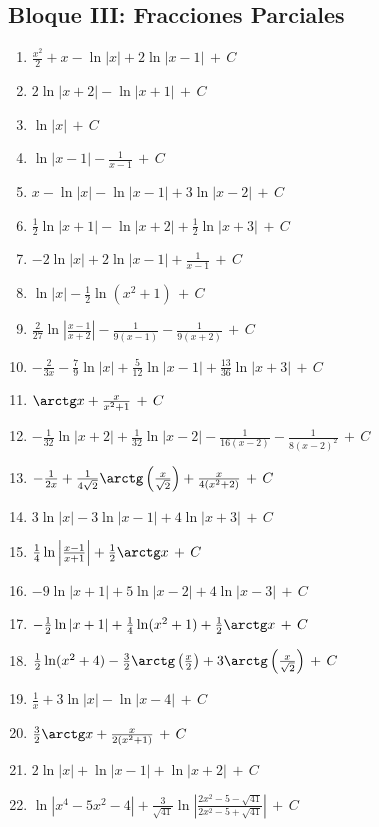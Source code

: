 \documentclass[12pt, letterpaper]{article}
\newcommand{\CC}{\,+\,C}
\begin{document}
\subsection*{Bloque III: Fracciones Parciales}
\begin{enumerate}[leftmargin=*, label=\textbf{\arabic*.}, resume]
  \item $\frac{x^2}{2} + x - \ln|x| + 2\ln|x-1| \CC$
  \item $2\ln|x+2| - \ln|x+1| \CC$
  \item $\ln|x| \CC$
  \item $\ln|x-1| - \frac{1}{x-1} \CC$
  \item $x - \ln|x| - \ln|x-1| + 3\ln|x-2| \CC$
  \item $\frac{1}{2}\ln|x+1| - \ln|x+2| + \frac{1}{2}\ln|x+3| \CC$
  \item $-2\ln|x| + 2\ln|x-1| + \frac{1}{x-1} \CC$
  \item $\ln|x| - \frac{1}{2}\ln(x^2+1) \CC$
  \item $\frac{2}{27}\ln\left|\frac{x-1}{x+2}\right| - \frac{1}{9(x-1)} - \frac{1}{9(x+2)} \CC$
  \item $-\frac{2}{3x} - \frac{7}{9}\ln|x| + \frac{5}{12}\ln|x-1| + \frac{13}{36}\ln|x+3| \CC$
  \item $\arctg x + \frac{x}{x^2+1} \CC$
  \item $-\frac{1}{32}\ln|x+2| + \frac{1}{32}\ln|x-2| - \frac{1}{16(x-2)} - \frac{1}{8(x-2)^2} \CC$
  \item $-\frac{1}{2x} + \frac{1}{4\sqrt{2}}\arctg\left(\frac{x}{\sqrt{2}}\right) + \frac{x}{4(x^2+2)} \CC$
  \item $3\ln|x| - 3\ln|x-1| + 4\ln|x+3| \CC$
  \item $\frac{1}{4}\ln\left|\frac{x-1}{x+1}\right| + \frac{1}{2}\arctg x \CC$
  \item $-9\ln|x+1| + 5\ln|x-2| + 4\ln|x-3| \CC$
  \item $-\frac{1}{2}\ln|x+1| + \frac{1}{4}\ln(x^2+1) + \frac{1}{2}\arctg x \CC$
  \item $\frac{1}{2}\ln(x^2+4) - \frac{3}{2}\arctg\left(\frac{x}{2}\right) + 3\arctg\left(\frac{x}{\sqrt{2}}\right) \CC$
  \item $\frac{1}{x} + 3\ln|x| - \ln|x-4| \CC$
  \item $\frac{3}{2}\arctg x + \frac{x}{2(x^2+1)} \CC$
  \item $2\ln|x| + \ln|x-1| + \ln|x+2| \CC$
  \item $\ln|x^4-5x^2-4| + \frac{3}{\sqrt{41}}\ln\left|\frac{2x^2-5-\sqrt{41}}{2x^2-5+\sqrt{41}}\right| \CC$

\end{enumerate}
\end{document}
